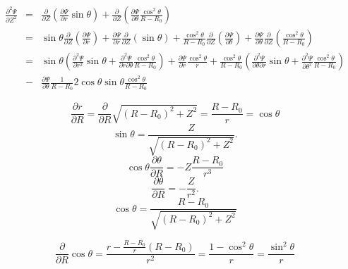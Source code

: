\documentclass{llncs}
\begin{document}
\begin{eqnarray}
  \frac{\partial^2 \Psi}{\partial Z^2} & = & \frac{\partial}{\partial Z}
  \left( \frac{\partial \Psi}{\partial r} \sin \theta \right) +
  \frac{\partial}{\partial Z} \left( \frac{\partial \Psi}{\partial \theta} 
  \frac{\cos^2 \theta}{R - R_0} \right) \nonumber\\
  & = & \sin \theta \frac{\partial}{\partial Z} \left( \frac{\partial
  \Psi}{\partial r} \right) + \frac{\partial \Psi}{\partial r} 
  \frac{\partial}{\partial Z} (\sin \theta) + \frac{\cos^2 \theta}{R - R_0} 
  \frac{\partial}{\partial Z} \left( \frac{\partial \Psi}{\partial \theta} 
  \right) + \frac{\partial \Psi}{\partial \theta} \frac{\partial}{\partial Z}
  \left( \frac{\cos^2 \theta}{R - R_0} \right) \nonumber\\
  & = & \sin \theta \left( \frac{\partial^2 \Psi}{\partial r^2} \sin \theta +
  \frac{\partial^2 \Psi}{\partial r \partial \theta}  \frac{\cos^2 \theta}{R -
  R_0} \right) + \frac{\partial \Psi}{\partial r}  \frac{\cos^2 \theta}{r} +
  \frac{\cos^2 \theta}{R - R_0}  \left( \frac{\partial^2 \Psi}{\partial \theta
  \partial r} \sin \theta + \frac{\partial^2 \Psi}{\partial \theta^2} 
  \frac{\cos^2 \theta}{R - R_0} \right) \nonumber\\
  & - & \frac{\partial \Psi}{\partial \theta}  \frac{1}{R - R_0} 2 \cos
  \theta \sin \theta \frac{\cos^2 \theta}{R - R_0}  \label{9-17-e1}
\end{eqnarray}



\begin{equation}
  \frac{\partial r}{\partial R} = \frac{\partial}{\partial R} \sqrt{(R -
  R_0)^2 + Z^2} = \frac{R - R_0}{r} = \cos \theta
\end{equation}
\[ \sin \theta = \frac{Z}{\sqrt{(R - R_0)^2 + Z^2}} . \]
\[ \cos \theta \frac{\partial \theta}{\partial R} = - Z \frac{R - R_0}{r^3} \]
\begin{equation}
  \frac{\partial \theta}{\partial R} = - \frac{Z}{r^2} .
\end{equation}
\[ \cos \theta = \frac{R - R_0}{\sqrt{(R - R_0)^2 + Z^2}} \]

\begin{equation}
  \frac{\partial}{\partial R} \cos \theta = \frac{r - \frac{R - R_0}{r} (R -
  R_0)}{r^2} = \frac{1 - \cos^2 \theta}{r} = \frac{\sin^2 \theta}{r}
\end{equation}
\end{document}
